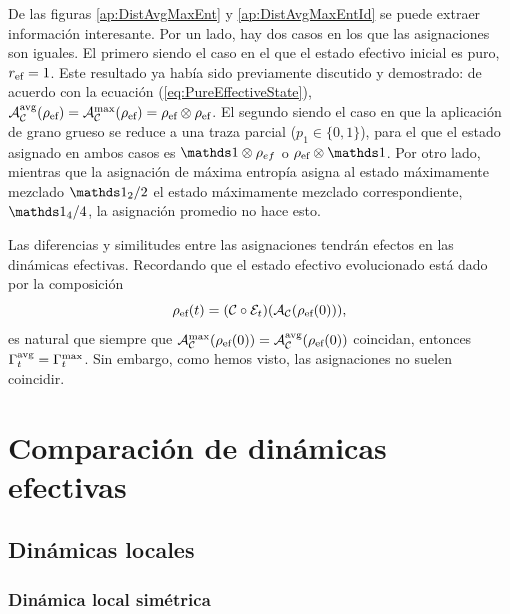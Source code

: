 De las figuras \ref{ap:DistAvgMaxEnt} y \ref{ap:DistAvgMaxEntId} se puede extraer información interesante. Por un lado, hay dos casos en los que las asignaciones son iguales. El primero siendo el caso en el que el estado efectivo inicial es puro, \ie{} $r_{\text{ef}}=1$. Este resultado ya había sido previamente discutido y demostrado: de acuerdo con la ecuación (\ref{eq:PureEffectiveState}), $\mathcal{A}_{\mathcal{C}}^{\text{avg}}(\rho_{\text{ef}})=\mathcal{A}_{\mathcal{C}}^{\max}(\rho_{\text{ef}})=\rho_{\text{ef}}\otimes\rho_{\text{ef}}$. El segundo siendo el caso en que la aplicación de grano grueso se reduce a una traza parcial ($p_{1}\in\{0,1\}$), para el que el estado asignado en ambos casos es $\Id\otimes\rho_{ef}$ o $\rho_{\ef}\otimes\Id$. Por otro lado, mientras que la asignación de máxima entropía asigna al estado máximamente mezclado $\Id_{2}/2$ el estado máximamente mezclado correspondiente, $\Id_{4}/4$, la asignación promedio no hace esto.

Las diferencias y similitudes entre las asignaciones tendrán efectos en las dinámicas efectivas. Recordando que el estado efectivo evolucionado está dado por la composición
\begin{equation}
    \rho_{\text{ef}}(t)=(\mathcal{C}\circ\mathcal{E}_{t})(\mathcal{A}_{\mathcal{C}}(\rho_{\text{ef}}(0))),\nonumber
\end{equation}
es natural que siempre que $\mathcal{A}_{\mathcal{C}}^{\max}(\rho_{\text{ef}}(0))=\mathcal{A}_{\mathcal{C}}^{\text{avg}}(\rho_{\text{ef}}(0))$ coincidan, entonces $\Gamma_{t}^{\text{avg}}=\Gamma_{t}^{\max}$. Sin embargo, como hemos visto, las asignaciones no suelen coincidir.


\section{Comparación de dinámicas efectivas}

\subsection{Dinámicas locales}

\subsubsection{Dinámica local simétrica}

